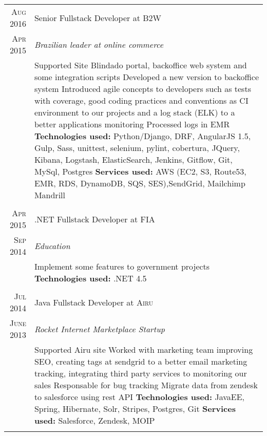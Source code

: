 \documentclass[a4paper,10pt]{article}
\begin{document}
\begin{tabular}{r|p{11cm}}
 \textsc{Aug 2016} & Senior Fullstack Developer at \textsc{B2W} \\\textsc{Apr 2015}&\emph{Brazilian leader at online commerce }\\&\footnotesize{
  Supported Site Blindado portal, backoffice web system and some integration scripts\newline
  Developed a new version to backoffice system\newline
    Introduced agile concepts to developers such as tests with coverage, good coding practices and conventions as CI environment to our projects and a log stack (ELK) to a better applications monitoring\newline
    Processed logs in EMR\newline    
\textbf{Technologies used:} Python/Django, DRF, AngularJS 1.5, Gulp, Sass, unittest, selenium, pylint, cobertura, JQuery, Kibana, Logstash, ElasticSearch, Jenkins, Gitflow, Git, MySql, Postgres\newline
\textbf{Services used:} AWS (EC2, S3, Route53, EMR, RDS, DynamoDB, SQS, SES),SendGrid, Mailchimp Mandrill}\\\multicolumn{2}{c}{} \\
\textsc{Apr 2015}  & .NET Fullstack Developer at \textsc{FIA} \\
\textsc{Sep 2014}&\emph{Education}\\&\footnotesize{Implement some features to government projects\newline
\textbf{Technologies used:} .NET 4.5 
 }\\\multicolumn{2}{c}{} \\
 \textsc{Jul 2014} & Java Fullstack Developer at \textsc{Airu} \\\textsc{June 2013}&\emph{Rocket Internet Marketplace Startup}\\&\footnotesize{ Supported Airu site\newline
    Worked with marketing team improving SEO, creating tags at sendgrid to a better email marketing tracking, integrating third party services to monitoring our sales\newline
    Responsable for bug tracking\newline
    Migrate data from zendesk to salesforce using rest API\newline
\textbf{Technologies used:} JavaEE, Spring, Hibernate, Solr, Stripes, Postgres, Git\newline
\textbf{Services used:} Salesforce, Zendesk, MOIP 
 }\\\multicolumn{2}{c}{} \\




 
 \end{tabular}
\end{document}
